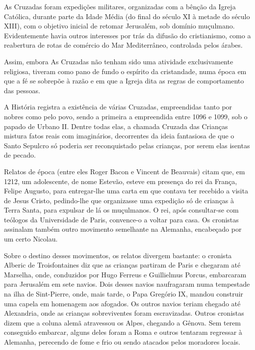 \documentclass[12pt]{extarticle}
\begin{document}
As Cruzadas foram expedições militares, organizadas com a bênção da
Igreja Católica, durante parte da Idade Média (do final do século XI à
metade do século XIII), com o objetivo inicial de retomar Jerusalém, sob
domínio muçulmano. Evidentemente havia outros interesses por trás da
difusão do cristianismo, como a reabertura de rotas de comércio do Mar
Mediterrâneo, controlada pelos árabes.




Assim, embora As Cruzadas não tenham sido uma atividade exclusivamente
religiosa, tiveram como pano de fundo o espírito da cristandade, numa
época em que a fé se sobrepõe à razão e em que a Igreja dita as regras
de comportamento das pessoas.

A História registra a existência de várias Cruzadas, empreendidas tanto
por nobres como pelo povo, sendo a primeira a empreendida entre 1096 e
1099, sob o papado de Urbano II. Dentre todas elas, a chamada Cruzada
das Crianças mistura fatos reais com imaginários, decorrentes da ideia
fantasiosa de que o Santo Sepulcro só poderia ser reconquistado pelas
crianças, por serem elas isentas de pecado.




Relatos de época (entre eles Roger Bacon e Vincent de Beauvais) citam
que, em 1212, um adolescente, de nome Estevão, esteve em presença do rei
da França, Felipe Augusto, para entregar-lhe uma carta em que contava
ter recebido a visita de Jesus Cristo, pedindo-lhe que organizasse uma
expedição só de crianças à Terra Santa, para expulsar de lá os
muçulmanos. O rei, após consultar-se com teólogos da Universidade de
Paris, convence-o a voltar para casa. Os cronistas assinalam também
outro movimento semelhante na Alemanha, encabeçado por um certo
Nicolau.

Sobre o destino desses movimentos, os relatos divergem bastante: o
cronista Alberic de Troisfontaines diz que as crianças partiram de Paris
e chegaram até Marselha, onde, conduzidos por Hugo Ferreus e Guillielmus
Porcus, embarcaram para Jerusalém em sete navios. Dois desses navios
naufragaram numa tempestade na ilha de Sint-Pierre, onde, mais tarde, o
Papa Gregório IX, mandou construir uma capela em homenagem aos afogados.
Os outros navios teriam chegado até Alexandria, onde as crianças
sobreviventes foram escravizadas. Outros cronistas dizem que a coluna
alemã atravessou os Alpes, chegando a Gênova. Sem terem conseguido
embarcar, alguns deles foram a Roma e outros tentaram regressar à
Alemanha, perecendo de fome e frio ou sendo atacados pelos moradores
locais.
\end{document}
